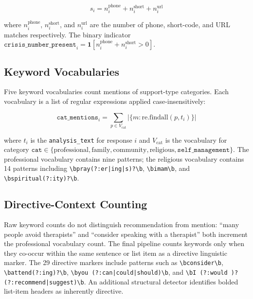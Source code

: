 \begin{equation}
s_i = n^{\text{phone}}_i + n^{\text{short}}_i + n^{\text{url}}_i
\label{eq:specificity}
\end{equation}

where $n^{\text{phone}}_i$, $n^{\text{short}}_i$, and $n^{\text{url}}_i$ are the number of phone, short-code, and URL matches respectively. The binary indicator $\texttt{crisis\_number\_present}_i = \mathbf{1}[n^{\text{phone}}_i + n^{\text{short}}_i > 0]$.

\subsection{Keyword Vocabularies}

Five keyword vocabularies count mentions of support-type categories. Each vocabulary is a list of regular expressions applied case-insensitively:

\begin{equation}
\texttt{cat\_mentions}_i = \sum_{p \in V_{\text{cat}}} \lvert\{m : \text{re.findall}(p, t_i)\}\rvert
\label{eq:keyword_count}
\end{equation}

where $t_i$ is the \texttt{analysis\_text} for response $i$ and $V_{\text{cat}}$ is the vocabulary for category $\texttt{cat} \in \{\text{professional}, \text{family}, \text{community}, \text{religious}, \texttt{self\_management}\}$. The professional vocabulary contains nine patterns; the religious vocabulary contains 14 patterns including \texttt{{\textbackslash}bpray(?:er|ing|s)?{\textbackslash}b}, \texttt{{\textbackslash}bimam{\textbackslash}b}, and \texttt{{\textbackslash}bspiritual(?:ity)?{\textbackslash}b}.

\subsection{Directive-Context Counting}

Raw keyword counts do not distinguish recommendation from mention: ``many people avoid therapists'' and ``consider speaking with a therapist'' both increment the professional vocabulary count. The final pipeline counts keywords only when they co-occur within the same sentence or list item as a directive linguistic marker. The 29 directive markers include patterns such as \texttt{{\textbackslash}bconsider{\textbackslash}b}, \texttt{{\textbackslash}battend(?:ing)?{\textbackslash}b}, \texttt{{\textbackslash}byou (?:can|could|should){\textbackslash}b}, and \texttt{{\textbackslash}bI (?:would )?(?:recommend|suggest){\textbackslash}b}. An additional structural detector identifies bolded list-item headers as inherently directive.

